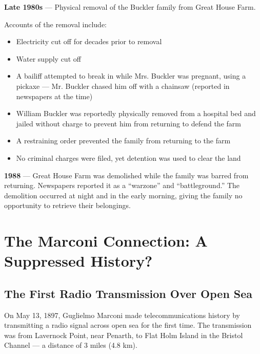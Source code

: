 \documentclass[11pt,a4paper]{article}
\begin{document}
\begin{timeline}
\textbf{Late 1980s} --- Physical removal of the Buckler family from Great House Farm.
\end{timeline}

Accounts of the removal include:
\begin{itemize}
    \item Electricity cut off for decades prior to removal
    \item Water supply cut off
    \item A bailiff attempted to break in while Mrs. Buckler was pregnant, using a pickaxe --- Mr. Buckler chased him off with a chainsaw (reported in newspapers at the time)
    \item William Buckler was reportedly physically removed from a hospital bed and jailed without charge to prevent him from returning to defend the farm
    \item A restraining order prevented the family from returning to the farm
    \item No criminal charges were filed, yet detention was used to clear the land
\end{itemize}

\begin{timeline}
\textbf{1988} --- Great House Farm was demolished while the family was barred from returning. Newspapers reported it as a ``warzone'' and ``battleground.'' The demolition occurred at night and in the early morning, giving the family no opportunity to retrieve their belongings.
\end{timeline}

\newpage

\section{The Marconi Connection: A Suppressed History?}

\subsection{The First Radio Transmission Over Open Sea}

\begin{keyfact}
On May 13, 1897, Guglielmo Marconi made telecommunications history by transmitting a radio signal across open sea for the first time. The transmission was from Lavernock Point, near Penarth, to Flat Holm Island in the Bristol Channel --- a distance of 3 miles (4.8 km).
\end{keyfact}
\end{document}

